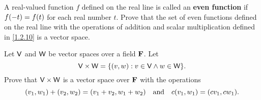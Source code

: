 \begin{ex}\label{ex:1.2.12}
  A real-valued function \(f\) defined on the real line is called an \textbf{even function} if \(f\p{-t} = f\p{t}\) for each real number \(t\).
  Prove that the set of even functions defined on the real line with the operations of addition and scalar multiplication defined in \cref{1.2.10} is a vector space.
\end{ex}

\setcounter{ex}{20}
\begin{ex}\label{ex:1.2.21}
  Let \(\mathsf{V}\) and \(\mathsf{W}\) be vector spaces over a field \(\mathbf{F}\).
  Let
  \[
    \V \times \W = \set{\p{v, w} : v \in \V \land w \in \W}.
  \]
  Prove that \(\mathsf{V} \times \mathsf{W}\) is a vector space over \(\mathbf{F}\) with the operations
  \[
    \p{v_1, w_1} + \p{v_2, w_2} = \p{v_1 + v_2, w_1 + w_2} \quad \text{and} \quad c\p{v_1, w_1} = \p{cv_1, cw_1}.
  \]
\end{ex}

